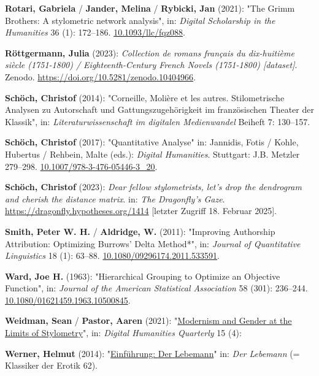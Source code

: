 \documentclass[
  12pt,
  letterpaper,
]{classicthesis}
\newlength{\cslhangindent}
\newenvironment{CSLReferences}[2] %
 {\begin{list}{}{%
  \setlength{\itemindent}{0pt}
  \setlength{\leftmargin}{0pt}
  \setlength{\parsep}{0pt}
  \ifodd #1
   \setlength{\leftmargin}{\cslhangindent}
   \setlength{\itemindent}{-1\cslhangindent}
  \fi
  \setlength{\itemsep}{#2\baselineskip}}}
 {\end{list}}
\begin{document}
\begin{CSLReferences}{1}{0}
\textbf{Rotari, Gabriela} / \textbf{Jander, Melina} / \textbf{Rybicki,
Jan} (2021): "The {Grimm} {Brothers}: {A} stylometric network analysis",
in: \emph{Digital Scholarship in the Humanities} 36 (1): 172--186.
\href{https://doi.org/10.1093/llc/fqz088}{10.1093/llc/fqz088}.

\textbf{Röttgermann, Julia} (2023): \emph{Collection de romans français
du dix-huitième siècle (1751-1800) / {Eighteenth}-{Century} {French}
{Novels} (1751-1800) {[}dataset{]}}. Zenodo.
\url{https://doi.org/10.5281/zenodo.10404966}.

\textbf{Schöch, Christof} (2014): "Corneille, {Molière} et les autres.
{Stilometrische} {Analysen} zu {Autorschaft} und {Gattungszugehörigkeit}
im französischen {Theater} der {Klassik}", in:
\emph{Literaturwissenschaft im digitalen Medienwandel} Beiheft 7:
130--157.

\textbf{Schöch, Christof} (2017): "Quantitative {Analyse}" in: Jannidis,
Fotis / Kohle, Hubertus / Rehbein, Malte (eds.): \emph{Digital
{Humanities}}. Stuttgart: J.B. Metzler 279--298.
\href{https://doi.org/10.1007/978-3-476-05446-3_20}{10.1007/978-3-476-05446-3\_20}.

\textbf{Schöch, Christof} (2023): \emph{Dear fellow stylometrists, let's
drop the dendrogram and cherish the distance matrix}. in: \emph{The
Dragonfly's Gaze}. \url{https://dragonfly.hypotheses.org/1414}
{[}letzter Zugriff 18. Februar 2025{]}.

\textbf{Smith, Peter W. H.} / \textbf{Aldridge, W.} (2011): "Improving
{Authorship} {Attribution}: {Optimizing} {Burrows}' {Delta} {Method}*",
in: \emph{Journal of Quantitative Linguistics} 18 (1): 63--88.
\href{https://doi.org/10.1080/09296174.2011.533591}{10.1080/09296174.2011.533591}.

\textbf{Ward, Joe H.} (1963): "Hierarchical {Grouping} to {Optimize} an
{Objective} {Function}", in: \emph{Journal of the American Statistical
Association} 58 (301): 236--244.
\href{https://doi.org/10.1080/01621459.1963.10500845}{10.1080/01621459.1963.10500845}.

\textbf{Weidman, Sean} / \textbf{Pastor, Aaren} (2021):
"\href{https://www.digitalhumanities.org/dhq/vol/15/4/000566/000566.html}{Modernism
and {Gender} at the {Limits} of {Stylometry}}", in: \emph{Digital
Humanities Quarterly} 15 (4):

\textbf{Werner, Helmut} (2014):
"\href{https://seyerlein.de/shop/item/9783944964744/klassiker-der-erotik-62-der-lebemann-von-andrea-de-nerciat-e-book-epub}{Einführung:
{Der} {Lebemann}}" in: \emph{Der {Lebemann}} (= Klassiker der {Erotik}
62).

\end{CSLReferences}
\end{document}
